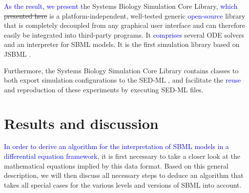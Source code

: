 \documentclass[10pt]{bmc_article}
\newenvironment{bmcformat}{\fussy\setboolean{publ}{true}}{\fussy}
\newcommand{\COR}[1]                      {\textcolor{blue}{#1}}
\begin{document}
\begin{bmcformat}
%
%
%
%
\COR{As the result, we present t}he Systems Biology Simulation Core Library\COR{, which}
\sout{presented here} is a platform-independent,
well-tested generic \COR{open-source} library that is completely decoupled from any graphical
user interface and can therefore easily be integrated into third-party programs.
It \COR{comprises} several \acf{ODE} solvers and an interpreter for \acs{SBML}
models.
It is the first simulation library based on JSBML \cite{Draeger2011b}. 
%

Furthermore, the Systems Biology Simulation Core Library contains classes to both export
simulation configurations to the \acf{SED-ML} \cite{Waltemath2011},
and facilitate the \COR{reuse} and reproduction of these experiments by executing \acs{SED-ML} files.

\section*{Results and discussion}

\COR{In order to derive an algorithm for the interpretation of \acs{SBML} models in a differential equation framework},
it is first necessary to take a closer look at the mathematical equations implied by this data format.
Based on this general description, we will then discuss all necessary steps
to deduce an algorithm that takes all special cases for the various levels and
versions of \acs{SBML} into account.


\end{bmcformat}
\end{document}
